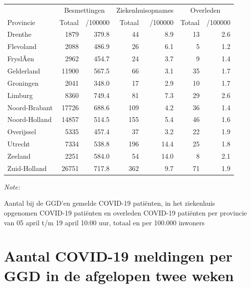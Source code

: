 \documentclass[
  english,
  man,floatsintext]{apa6}
\begin{document}
\begin{table}
\centering
\begin{threeparttable}
\begin{tabular}{lrrrrrr}
\toprule
\multicolumn{1}{c}{ } & \multicolumn{2}{c}{Besmettingen} & \multicolumn{2}{c}{Ziekenhuisopnames} & \multicolumn{2}{c}{Overleden} \\
\cmidrule(l{3pt}r{3pt}){2-3} \cmidrule(l{3pt}r{3pt}){4-5} \cmidrule(l{3pt}r{3pt}){6-7}
Provincie & Totaal & /100000 & Totaal & /100000 & Totaal & /100000\\
\midrule
Drenthe & 1879 & 379.8 & 44 & 8.9 & 13 & 2.6\\
Flevoland & 2088 & 486.9 & 26 & 6.1 & 5 & 1.2\\
FryslÃ¢n & 2962 & 454.7 & 24 & 3.7 & 9 & 1.4\\
Gelderland & 11900 & 567.5 & 66 & 3.1 & 35 & 1.7\\
Groningen & 2041 & 348.0 & 17 & 2.9 & 10 & 1.7\\
Limburg & 8360 & 749.4 & 81 & 7.3 & 29 & 2.6\\
Noord-Brabant & 17726 & 688.6 & 109 & 4.2 & 36 & 1.4\\
Noord-Holland & 14857 & 514.5 & 155 & 5.4 & 46 & 1.6\\
Overijssel & 5335 & 457.4 & 37 & 3.2 & 22 & 1.9\\
Utrecht & 7334 & 538.8 & 196 & 14.4 & 25 & 1.8\\
Zeeland & 2251 & 584.0 & 54 & 14.0 & 8 & 2.1\\
Zuid-Holland & 26751 & 717.8 & 362 & 9.7 & 71 & 1.9\\
\bottomrule
\end{tabular}
\begin{tablenotes}
\item \textit{Note: } 
\item Aantal bij de GGD’en gemelde COVID-19 patiënten, in het ziekenhuis opgenomen COVID-19 patiënten en overleden COVID-19 patiënten per provincie van 05 april t/m 19 april 10:00 uur, totaal en per 100.000 inwoners
\end{tablenotes}
\end{threeparttable}
\end{table}

\newpage

\hypertarget{aantal-covid-19-meldingen-per-ggd-in-de-afgelopen-twee-weken}{%
\section{Aantal COVID-19 meldingen per GGD in de afgelopen twee weken}\label{aantal-covid-19-meldingen-per-ggd-in-de-afgelopen-twee-weken}}
\end{document}
